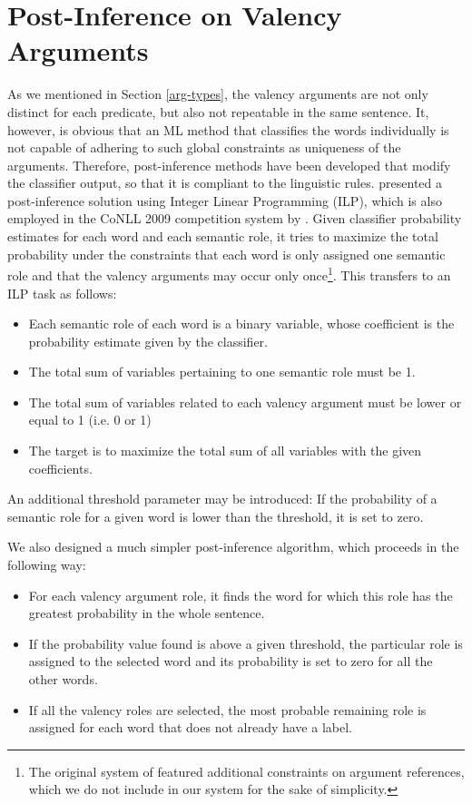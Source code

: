 \documentclass[12pt,notitlepage]{report}
\begin{document}
\section{Post-Inference on Valency Arguments}\label{post-inference}

As we mentioned in Section \ref{arg-types}, the valency arguments are not only distinct for each predicate, but also not repeatable in the same sentence. It, however, is obvious that an ML method that classifies the words individually is not capable of adhering to such global constraints as uniqueness of the arguments. Therefore, post-inference methods have been developed that modify the classifier output, so that it is compliant to the linguistic rules. \citet{punyakanok04} presented a post-inference solution using Integer Linear Programming (ILP), which is also employed in the CoNLL 2009 competition system by \citet{che09}. Given classifier probability estimates for each word and each semantic role, it tries to maximize the total probability under the constraints that each word is only assigned one semantic role and that the valency arguments may occur only once\footnote{The original system of \citet{punyakanok04} featured additional constraints on argument references, which we do not include in our system for the sake of simplicity.}. This transfers to an ILP task as follows:
\begin{itemize}
    \item Each semantic role of each word is a binary variable, whose coefficient is the probability estimate given by the classifier.
    \item The total sum of variables pertaining to one semantic role must be 1.
    \item The total sum of variables related to each valency argument must be lower or equal to 1 (i.e. 0 or 1)
    \item The target is to maximize the total sum of all variables with the given coefficients.
\end{itemize}
An additional threshold parameter may be introduced: If the probability of a semantic role for a given word is lower than the threshold, it is set to zero.

We also designed a much simpler post-inference algorithm, which proceeds in the following way:
\begin{itemize}
    \item For each valency argument role, it finds the word for which this role has the greatest probability in the whole sentence.
    \item If the probability value found is above a given threshold, the particular role is assigned to the selected word and its probability is set to zero for all the other words.
    \item If all the valency roles are selected, the most probable remaining role is assigned for each word that does not already have a label.
\end{itemize}
\end{document}
